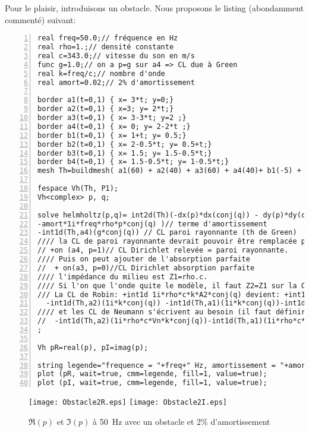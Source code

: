 Pour le plaisir, introduisons un obstacle. Nous proposons le listing \freefem (abondamment commenté) suivant:
\scriptsize
\begin{Verbatim}[numbers=left,numbersep=3pt,firstnumber=1]
real freq=50.0;// fréquence en Hz
real rho=1.;// densité constante
real c=343.0;// vitesse du son en m/s
func g=1.0;// on a p=g sur a4 => CL due à Green
real k=freq/c;// nombre d'onde
real amort=0.02;// 2% d'amortissement

border a1(t=0,1) { x= 3*t; y=0;}
border a2(t=0,1) { x=3; y= 2*t;}
border a3(t=0,1) { x= 3-3*t; y=2 ;}
border a4(t=0,1) { x= 0; y= 2-2*t ;}
border b1(t=0,1) { x= 1+t; y= 0.5;}
border b2(t=0,1) { x= 2-0.5*t; y= 0.5+t;}
border b3(t=0,1) { x= 1.5; y= 1.5-0.5*t;}
border b4(t=0,1) { x= 1.5-0.5*t; y= 1-0.5*t;}
mesh Th=buildmesh( a1(60) + a2(40) + a3(60) + a4(40)+ b1(-5) + b2(-5) + b3(-5) + b4(-5));

fespace Vh(Th, P1);
Vh<complex> p, q;

solve helmholtz(p,q)= int2d(Th)(-dx(p)*dx(conj(q)) - dy(p)*dy(conj(q)) +k*k*p*conj(q) // forme bilin non amortie
-amort*1i*freq*rho*p*conj(q) )// terme d'amortissement
-int1d(Th,a4)(g*conj(q)) // CL paroi rayonnante (th de Green)
//// la CL de paroi rayonnante devrait pouvoir être remplacée par une CL de Dirichlet relevée:
// +on (a4, p=1)// CL Dirichlet relevée = paroi rayonnante.
//// Puis on peut ajouter de l'absorption parfaite
//  + on(a3, p=0)//CL Dirichlet absorption parfaite
//// l'impédance du milieu est Z1=rho.c. 
//// Si l'on que l'onde quite le modèle, il faut Z2=Z1 sur la CL de Robin: 
/// La CL de Robin: +int1d 1i*rho*c*k*A2*conj(q) devient: +int1d 1i*k*conj(q)
  -int1d(Th,a2)(1i*k*conj(q)) -int1d(Th,a1)(1i*k*conj(q))-int1d(Th,a3)(1i*k*conj(q))// CL Robin milieu infini
//// et les CL de Neumann s'écrivent au besoin (il faut définir Vn)
//  -int1d(Th,a2)(1i*rho*c*Vn*k*conj(q))-int1d(Th,a1)(1i*rho*c*k*Vn*conj(q))-int1d(Th,a3)(1i*rho*c*k*Vn*conj(q))// CL Neumann
;

Vh pR=real(p), pI=imag(p);

string legende="frequence = "+freq+" Hz, amortissement = "+amort*100+"%";
plot (pR, wait=true, cmm=legende, fill=1, value=true);
plot (pI, wait=true, cmm=legende, fill=1, value=true);
\end{Verbatim}
\normalsize
\begin{figure}[h!]
\centering
   \texttt{[image: Obstacle2R.eps]} \hspace{10mm}
   \texttt{[image: Obstacle2I.eps]}
\caption{$\Re(p)$ et $\Im(p)$ à 50~Hz avec un obstacle et 2\% d'amortissement}\label{Fig-Obstacle2}
\end{figure}

